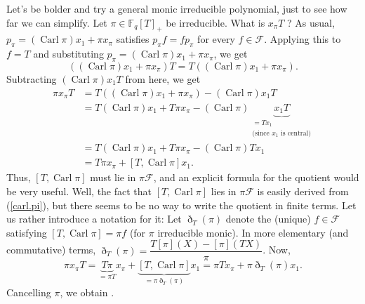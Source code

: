 \documentclass[numbers=enddot,12pt,final,onecolumn,notitlepage]{scrartcl}%
\theoremstyle{definition}
\begin{document}
Let's be bolder and try a general monic irreducible polynomial, just to see
how far we can simplify. Let $\pi\in\mathbb{F}_{q}\left[  T\right]  _{+}$ be
irreducible. What is $x_{\pi}T$ ? As usual, $p_{\pi}=\left(
\operatorname*{Carl}\pi\right)  x_{1}+\pi x_{\pi}$ satisfies $p_{\pi}%
f=fp_{\pi}$ for every $f\in\mathcal{F}$. Applying this to $f=T$ and
substituting $p_{\pi}=\left(  \operatorname*{Carl}\pi\right)  x_{1}+\pi
x_{\pi}$, we get%
\[
\left(  \left(  \operatorname*{Carl}\pi\right)  x_{1}+\pi x_{\pi}\right)
T=T\left(  \left(  \operatorname*{Carl}\pi\right)  x_{1}+\pi x_{\pi}\right)  .
\]
Subtracting $\left(  \operatorname*{Carl}\pi\right)  x_{1}T$ from here, we get%
\begin{align*}
\pi x_{\pi}T &  =T\left(  \left(  \operatorname*{Carl}\pi\right)  x_{1}+\pi
x_{\pi}\right)  -\left(  \operatorname*{Carl}\pi\right)  x_{1}T\\
&  =T\left(  \operatorname*{Carl}\pi\right)  x_{1}+T\pi x_{\pi}-\left(
\operatorname*{Carl}\pi\right)  \underbrace{x_{1}T}_{\substack{=Tx_{1}%
\\\text{(since }x_{1}\text{ is central)}}}\\
&  =T\left(  \operatorname*{Carl}\pi\right)  x_{1}+T\pi x_{\pi}-\left(
\operatorname*{Carl}\pi\right)  Tx_{1}\\
&  =T\pi x_{\pi}+\left[  T,\operatorname*{Carl}\pi\right]  x_{1}.
\end{align*}
Thus, $\left[  T,\operatorname*{Carl}\pi\right]  $ must lie in $\pi
\mathcal{F}$, and an explicit formula for the quotient would be very useful.
Well, the fact that $\left[  T,\operatorname*{Carl}\pi\right]  $ lies in
$\pi\mathcal{F}$ is easily derived from (\ref{carl.pi}), but there seems to be
no way to write the quotient in finite terms. Let us rather introduce a
notation for it: Let $\eth _{T}\left(  \pi\right)  $ denote the (unique)
$f\in\mathcal{F}$ satisfying $\left[  T,\operatorname*{Carl}\pi\right]  =\pi
f$ (for $\pi$ irreducible monic). In more elementary (and commutative) terms,
$\eth _{T}\left(  \pi\right)  =\dfrac{T\left[  \pi\right]  \left(  X\right)
-\left[  \pi\right]  \left(  TX\right)  }{\pi}$. Now,%
\[
\pi x_{\pi}T=\underbrace{T\pi}_{=\pi T}x_{\pi}+\underbrace{\left[
T,\operatorname*{Carl}\pi\right]  }_{=\pi\eth _{T}\left(  \pi\right)  }%
x_{1}=\pi Tx_{\pi}+\pi\eth _{T}\left(  \pi\right)  x_{1}.
\]
Cancelling $\pi$, we obtain .
\end{document}
